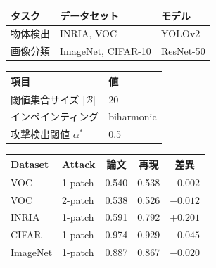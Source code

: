 
\begin{table}[htbp]
\centering
\begin{tabular}{lll}
\toprule
タスク & データセット & モデル \\
\midrule
物体検出 & INRIA, VOC & YOLOv2 \\
画像分類 & ImageNet, CIFAR-10 & ResNet-50 \\
\bottomrule
\end{tabular}
\end{table}

\begin{table}[htbp]
\centering
\begin{tabular}{ll}
\toprule
項目 & 値 \\
\midrule
閾値集合サイズ $|\mathcal{B}|$ & 20 \\
インペインティング & biharmonic \\
攻撃検出閾値 $\alpha^*$ & 0.5 \\
\bottomrule
\end{tabular}
\end{table}

\begin{table}[htbp]
\centering
\begin{tabular}{llccc}
\toprule
Dataset & Attack & 論文 & 再現 & 差異 \\
\midrule
VOC & 1-patch & 0.540 & 0.538 & $-0.002$ \\
VOC & 2-patch & 0.538 & 0.526 & $-0.012$ \\
INRIA & 1-patch & 0.591 & 0.792 & $+0.201$ \\
CIFAR & 1-patch & 0.974 & 0.929 & $-0.045$ \\
ImageNet & 1-patch & 0.887 & 0.867 & $-0.020$ \\
\bottomrule
\end{tabular}
\end{table}


